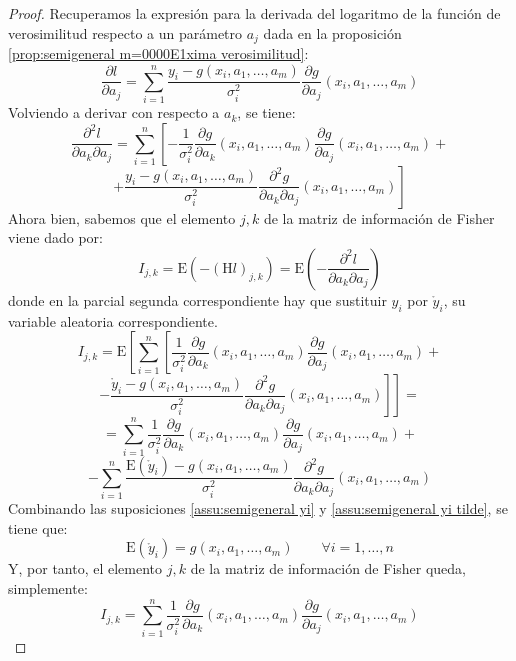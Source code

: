 \documentclass[11pt,a4paper,spanish]{article}
\numberwithin{equation}{section}
\numberwithin{table}{section}
\numberwithin{figure}{section}
\theoremstyle{definition}
\theoremstyle{remark}
\theoremstyle{definition}
\theoremstyle{remark}
\theoremstyle{plain}
\theoremstyle{plain}
\theoremstyle{plain}
\theoremstyle{plain}
\theoremstyle{plain}
\theoremstyle{plain}
\begin{document}
	\begin{proof}
		Recuperamos la expresión para la derivada del logaritmo de la función
		de verosimilitud respecto a un parámetro $a_{j}$ dada en la proposición
		\vref{prop:semigeneral m=0000E1xima verosimilitud}:
		\[
		\frac{\partial l}{\partial a_{j}}=\sum_{i=1}^{n}\frac{y_{i}-g\left(x_{i},a_{1},\dots,a_{m}\right)}{\sigma_{i}^{2}}\frac{\partial g}{\partial a_{j}}\left(x_{i},a_{1},\dots,a_{m}\right)
		\]
		Volviendo a derivar con respecto a $a_{k}$, se tiene:
		\[
		\frac{\partial^{2}l}{\partial a_{k}\partial a_{j}}=\sum_{i=1}^{n}\left[-\frac{1}{\sigma_{i}^{2}}\frac{\partial g}{\partial a_{k}}\left(x_{i},a_{1},\dots,a_{m}\right)\frac{\partial g}{\partial a_{j}}\left(x_{i},a_{1},\dots,a_{m}\right)+\right.
		\]
		\[
		\left.+\frac{y_{i}-g\left(x_{i},a_{1},\dots,a_{m}\right)}{\sigma_{i}^{2}}\frac{\partial^{2}g}{\partial a_{k}\partial a_{j}}\left(x_{i},a_{1},\dots,a_{m}\right)\right]
		\]
		Ahora bien, sabemos que el elemento $j,k$ de la matriz de información
		de Fisher viene dado por:
		\[
		I_{j,k}=\mathrm{E}\left(-\left(\mathrm{H}l\right)_{j,k}\right)=\mathrm{E}\left(-\frac{\partial^{2}l}{\partial a_{k}\partial a_{j}}\right)
		\]
		donde en la parcial segunda correspondiente hay que sustituir $y_{i}$
		por $\mathring{y}_{i}$, su variable aleatoria correspondiente.
		\[
		I_{j,k}=\mathrm{E}\left[\sum_{i=1}^{n}\left[\frac{1}{\sigma_{i}^{2}}\frac{\partial g}{\partial a_{k}}\left(x_{i},a_{1},\dots,a_{m}\right)\frac{\partial g}{\partial a_{j}}\left(x_{i},a_{1},\dots,a_{m}\right)+\right.\right.
		\]
		\[
		\left.\left.-\frac{\mathring{y}_{i}-g\left(x_{i},a_{1},\dots,a_{m}\right)}{\sigma_{i}^{2}}\frac{\partial^{2}g}{\partial a_{k}\partial a_{j}}\left(x_{i},a_{1},\dots,a_{m}\right)\right]\right]=
		\]
		\[
		=\sum_{i=1}^{n}\frac{1}{\sigma_{i}^{2}}\frac{\partial g}{\partial a_{k}}\left(x_{i},a_{1},\dots,a_{m}\right)\frac{\partial g}{\partial a_{j}}\left(x_{i},a_{1},\dots,a_{m}\right)+
		\]
		\[
		-\sum_{i=1}^{n}\frac{\mathrm{E}\left(\mathring{y}_{i}\right)-g\left(x_{i},a_{1},\dots,a_{m}\right)}{\sigma_{i}^{2}}\frac{\partial^{2}g}{\partial a_{k}\partial a_{j}}\left(x_{i},a_{1},\dots,a_{m}\right)
		\]
		Combinando las suposiciones \vref{assu:semigeneral yi} y \vref{assu:semigeneral yi tilde},
		se tiene que:
		\[
		\mathrm{E}\left(\mathring{y}_{i}\right)=g\left(x_{i},a_{1},\dots,a_{m}\right)\qquad\forall i=1,\dots,n
		\]
		Y, por tanto, el elemento $j,k$ de la matriz de información de Fisher
		queda, simplemente:
		\[
		I_{j,k}=\sum_{i=1}^{n}\frac{1}{\sigma_{i}^{2}}\frac{\partial g}{\partial a_{k}}\left(x_{i},a_{1},\dots,a_{m}\right)\frac{\partial g}{\partial a_{j}}\left(x_{i},a_{1},\dots,a_{m}\right)
		\]
		
	\end{proof}
\end{document}
